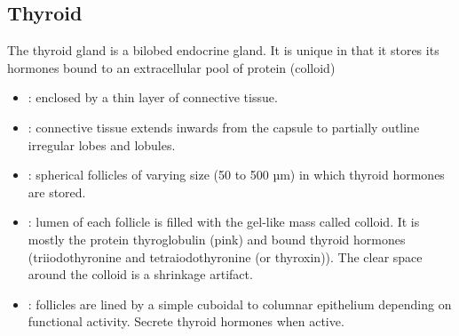 \subsection{Thyroid}
The thyroid gland is a bilobed endocrine gland. It is unique in that it stores its hormones bound to an extracellular pool of protein (colloid)
\begin{center}
\end{center}
\begin{multicols}{2}
\begin{itemize}
  \item {}: enclosed by a thin layer of connective tissue.
  
  \begin{center}
  \end{center}
  
  \item {}: connective tissue extends inwards from the capsule to partially outline irregular lobes and lobules.
  
  \begin{center}
  \end{center}
  
  \item {}: spherical follicles of varying size (50 to 500 µm) in which thyroid hormones are stored.
   
  \begin{center}
  \end{center}
  
  \item {}: lumen of each follicle is filled with the gel-like mass called colloid. It is mostly the protein thyroglobulin (pink) and bound thyroid hormones (triiodothyronine and tetraiodothyronine (or thyroxin)). The clear space around the colloid is a shrinkage artifact.
  
  \begin{center}
  \end{center}
  
  \item {}: follicles are lined by a simple cuboidal to columnar epithelium depending on functional activity. Secrete thyroid hormones when active.


\end{itemize}
\end{multicols}
